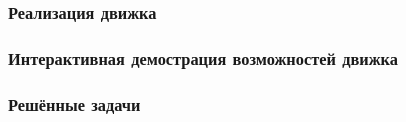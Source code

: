 \documentclass[xetex,aspectratio=43]{beamer}
\begin{document}
\begin{frame}
    \frametitle{Реализация движка}


\end{frame}

\begin{frame}
    \frametitle{Интерактивная демострация возможностей движка}


\end{frame}

\begin{frame}
    \frametitle{Решённые задачи}


\end{frame}

\begin{frame}
    \titlepage
\end{frame}
\end{document}

